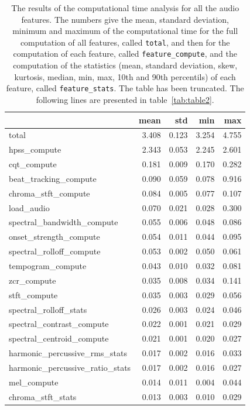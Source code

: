 \documentclass[11pt]{article}
\begin{document}
\begin{table}
  \centering
    \caption{The results of the computational time analysis for all the audio features. The numbers give the mean, standard deviation, minimum and maximum of the computational time for the full computation of all features, called \texttt{total}, and then for the computation of each feature, called \texttt{feature\_compute}, and the computation of the statistics (mean, standard deviation, skew, kurtosis, median, min, max, 10th and 90th percentils) of each feature, called \texttt{feature\_stats}. The table has been truncated. The following lines are presented in table~\ref{tab:table2}.}
    \label{tab:table1}
  \begin{tabular}{lrrrr}
    \toprule
    & mean & std & min & max \\
    \midrule
    total & 3.408 & 0.123 & 3.254 & 4.755 \\
 hpss\_compute & 2.343 & 0.053 & 2.245 & 2.601 \\
cqt\_compute & 0.181 & 0.009 & 0.170 & 0.282 \\
beat\_tracking\_compute & 0.090 & 0.059 & 0.078 & 0.916 \\
chroma\_stft\_compute & 0.084 & 0.005 & 0.077 & 0.107 \\
load\_audio & 0.070 & 0.021 & 0.028 & 0.300 \\
spectral\_bandwidth\_compute & 0.055 & 0.006 & 0.048 & 0.086 \\
onset\_strength\_compute & 0.054 & 0.011 & 0.044 & 0.095 \\
spectral\_rolloff\_compute & 0.053 & 0.002 & 0.050 & 0.061 \\
tempogram\_compute & 0.043 & 0.010 & 0.032 & 0.081 \\
zcr\_compute & 0.035 & 0.008 & 0.034 & 0.141 \\
stft\_compute & 0.035 & 0.003 & 0.029 & 0.056 \\
spectral\_rolloff\_stats & 0.026 & 0.003 & 0.024 & 0.046 \\
spectral\_contrast\_compute & 0.022 & 0.001 & 0.021 & 0.029 \\
spectral\_centroid\_compute & 0.021 & 0.001 & 0.020 & 0.027 \\
harmonic\_percussive\_rms\_stats & 0.017 & 0.002 & 0.016 & 0.033 \\
harmonic\_percussive\_ratio\_stats & 0.017 & 0.002 & 0.016 & 0.027 \\
mel\_compute & 0.014 & 0.011 & 0.004 & 0.044 \\
chroma\_stft\_stats & 0.013 & 0.003 & 0.010 & 0.029 \\

\end{tabular}
\end{table}
\end{document}
